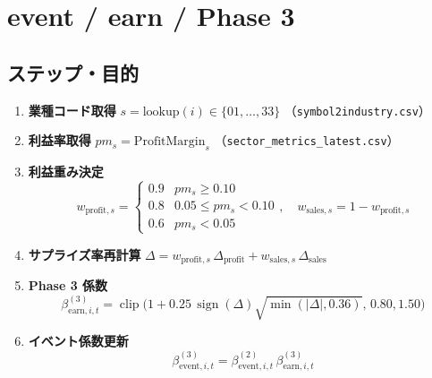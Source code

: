 
\section*{event / earn / Phase 3}\nopagebreak[4]
\subsection*{ステップ・目的}
\begin{flushleft}
\begin{enumerate}
  \item \textbf{業種コード取得}\;
        \( s=\text{lookup}(i)\in\{01,\dots,33\} \)  
        （\texttt{symbol2industry.csv}）
  \item \textbf{利益率取得}\;
        \( pm_s=\text{ProfitMargin}_s \)  
        （\texttt{sector\_metrics\_latest.csv}）
  \item \textbf{利益重み決定}\;
        \[
          w_{\text{profit},s}=
          \begin{cases}
            0.9 & pm_s \ge 0.10\\
            0.8 & 0.05 \le pm_s < 0.10\\
            0.6 & pm_s < 0.05
          \end{cases},
          \quad
          w_{\text{sales},s}=1-w_{\text{profit},s}
        \]
  \item \textbf{サプライズ率再計算}\;
        \( \Delta = w_{\text{profit},s}\,\Delta_{\text{profit}}
                 + w_{\text{sales},s}\,\Delta_{\text{sales}} \)
  \item \textbf{Phase 3 係数}\;
        \[
          \beta_{\text{earn},i,t}^{(3)}
            =\operatorname{clip}\!\bigl(
               1+0.25\,\operatorname{sign}(\Delta)
               \sqrt{\min(|\Delta|,0.36)},\,0.80,1.50\bigr)
        \]
  \item \textbf{イベント係数更新}\;
        \[
          \beta_{\text{event},i,t}^{(3)}
            =\beta_{\text{event},i,t}^{(2)}\,
             \beta_{\text{earn},i,t}^{(3)}
        \]
\end{enumerate}
\end{flushleft}

